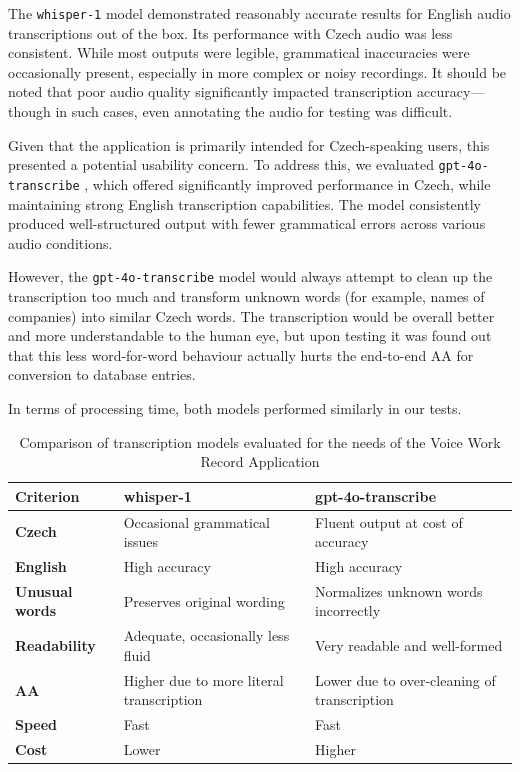 \documentclass[
  digital,     %
  oneside,     %
  nosansbold,  %
  nocolorbold, %
  lof,         %
  lot,         %
]{fithesis4}
\begin{document}
The \texttt{whisper-1} model demonstrated reasonably accurate results for English audio transcriptions out of the box. Its performance with Czech audio was less consistent. While most outputs were legible, grammatical inaccuracies were occasionally present, especially in more complex or noisy recordings. It should be noted that poor audio quality significantly impacted transcription accuracy—though in such cases, even annotating the audio for testing was difficult.

Given that the application is primarily intended for Czech-speaking users, this presented a potential usability concern. To address this, we evaluated \texttt{gpt-4o-transcribe} , which offered significantly improved performance in Czech, while maintaining strong English transcription capabilities. The model consistently produced well-structured output with fewer grammatical errors across various audio conditions.

However, the \texttt{gpt-4o-transcribe} model would always attempt to clean up the transcription too much and transform unknown words (for example, names of companies) into similar Czech words. The transcription would be overall better and more understandable to the human eye, but upon testing it was found out that this less word-for-word behaviour actually hurts the end-to-end \gls{AA} for conversion to database entries.

In terms of processing time, both models performed similarly in our tests. 

\shorthandon{-}

\begin{table}[H]
\centering
\begin{tabularx}{\textwidth}{|X|X|X|}
\hline
\textbf{Criterion} & \textbf{whisper-1} & \textbf{gpt-4o-transcribe} \\
\hline
\textbf{Czech} & Occasional grammatical issues & Fluent output at cost of accuracy \\
\hline
\textbf{English} & High accuracy & High accuracy \\
\hline
\textbf{Unusual words} & Preserves original wording & Normalizes unknown words incorrectly \\
\hline
\textbf{Readability} & Adequate, occasionally less fluid & Very readable and well-formed \\
\hline
\textbf{\gls{AA}} & Higher due to more literal transcription & Lower due to over-cleaning of transcription \\
\hline
\textbf{Speed} & Fast & Fast \\
\hline
\textbf{Cost} & Lower & Higher \\
\hline
\end{tabularx}
\caption{Comparison of transcription models evaluated for the needs of the Voice Work Record Application}
\label{tab:transcription_models}
\end{table}
\end{document}
